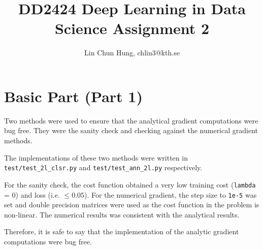 \documentclass[12pt]{article}
\newenvironment{question}[2][Question]{\begin{trivlist}
\kern10pt
\item[\hskip \labelsep {\bfseries #1}\hskip \labelsep {\bfseries #2.}]}{\end{trivlist}}
\begin{document}
\title{DD2424 Deep Learning in Data Science Assignment 2}
\author{Lin Chun Hung, chlin3@kth.se}

\maketitle

\section{Basic Part (Part 1)}
\begin{question}{i}
Two methods were used to ensure that the analytical gradient computations were bug
free.
They were the sanity check and checking against the numerical gradient methods.

The implementations of these two methods were written in
\texttt{test/test\_2l\_clsr.py} and \texttt{test/test\_ann\_2l.py} respectively.

For the sanity check, the cost function obtained a very low training cost (\texttt{lambda} = 0)
and loss (i.e. $\leq 0.05$).
For the numerical gradient, the step size to \texttt{1e-5} was set and
double precision matrices were used as the cost function in the problem is non-linear.
The numerical results was consistent with the analytical results.

Therefore, it is safe to say that the implementation of the
analytic gradient computations were bug free.
\end{question}
\end{document}
